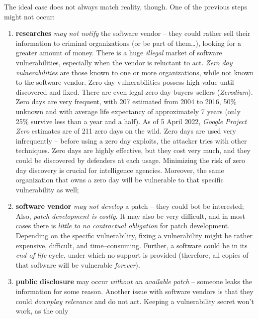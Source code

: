 \documentclass[10pt]{extbook}
\begin{document}
The ideal case does not always match reality, though. One of the previous steps
might not occur:
\begin{enumerate}
    \item \textbf{researches} \emph{may not notify} the software vendor -- they
        could rather sell their information to criminal organizations (or be
        part of them\dots), looking for a greater amount of money. There is a
        huge \emph{illegal} market of software vulnerabilities, especially when
        the vendor is reluctant to act. \emph{Zero day vulnerabilities} are
        those known to one or more organizations, while not known to the
        software vendor. Zero day vulnerabilities possess high value until
        discovered and fixed. There are even legal zero day buyers--sellers
        (\emph{Zerodium}). Zero days are very frequent, with 207 estimated from
        2004 to 2016, 50\% unknown and with average life expectancy of
        approximately 7 years (only 25\% survive less than a year and a half).
        As of 5 April 2022, \emph{Google Project Zero} estimates are of 211
        zero days on the wild. Zero days are used very infrequently -- before
        using a zero day exploits, the attacker tries with other techniques.
        Zero days are highly effective, but they cost very much, and they could
        be discovered by defenders at each usage. Minimizing the risk of zero
        day discovery is crucial for intelligence agencies. Moreover, the same
        organization that owns a zero day will be vulnerable to that specific
        vulnerability as well;
    \item \textbf{software vendor} \emph{may not develop} a patch -- they could
        bot be interested; Also, \emph{patch development is costly}. It may
        also be very difficult, and in most cases there is \emph{little to no
        contractual obligation} for patch development. Depending on the
        specific vulnerability, fixing a vulnerability might be rather
        expensive, difficult, and time--consuming. Further, a software could be
        in its \emph{end of life} cycle, under which no support is provided
        (therefore, all copies of that software will be vulnerable
        \emph{forever}).
    \item \textbf{public disclosure} may occur \emph{without an available patch}
        -- someone leaks the information for some reason. Another issue with
        software vendors is that they could \emph{downplay relevance} and do
        not act. Keeping a vulnerability secret won't work, as the only

\end{enumerate}
\end{document}
